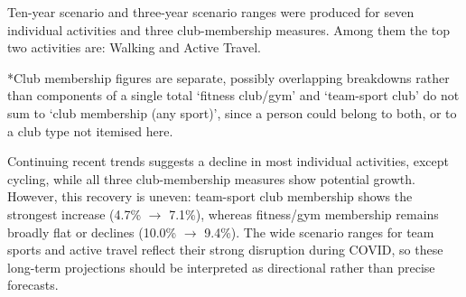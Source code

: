 \documentclass[ %
                    author={Ashrey Ashrey, Sanya Kapoor, Trisha Sharma, Yash Bhooshan Pandloskar},
                supervisor={Dr. Dalila O’Grady},
                    degree={MSc},
                     title={Using machine learning to forecast physical activity participation, volunteering and activity patterns in London},
                  subtitle={},
                      type={},
                      year={2021}]{dissertation}
\begin{document}
Ten-year scenario and three-year scenario ranges were produced for seven individual activities and three club-membership measures. Among them the top two activities are: Walking and Active Travel.

\begin{table}[!htb]
\centering
{}
\caption{Ten-year scenario range by activity/club type (\% of London adults).}
\label{tab:p1-1}
\end{table}

\noindent
*Club membership figures are separate, possibly overlapping breakdowns rather than components of a single total ‘fitness club/gym’ and ‘team-sport club’ do not sum to ‘club membership (any sport)’, since a person could belong to both, or to a club type not itemised here.

Continuing recent trends suggests a decline in most individual activities, except cycling, while all three club-membership measures show potential growth. However, this recovery is uneven: team-sport club membership shows the strongest increase (4.7\% $\rightarrow$ 7.1\%), whereas fitness/gym membership remains broadly flat or declines (10.0\% $\rightarrow$ 9.4\%). The wide scenario ranges for team sports and active travel reflect their strong disruption during COVID, so these long-term projections should be interpreted as directional rather than precise forecasts.
\end{document}
